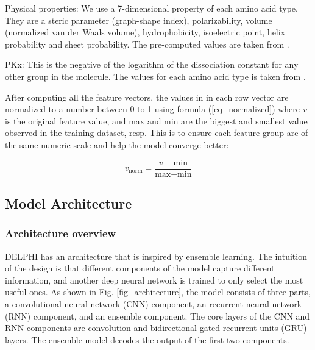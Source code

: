Physical properties: We use a 7-dimensional property of each amino acid type. They are a steric parameter (graph-shape index), polarizability, volume (normalized van der Waals volume), hydrophobicity, isoelectric point, helix probability and sheet probability. The pre-computed values are taken from \cite{zhang2019sequence}.

PKx: This is the negative of the logarithm of the dissociation constant for any other group in the molecule. The values for each amino acid type is taken from \cite{zhang2019sequence}.

After computing all the feature vectors, the values in in each row vector are normalized to a number between 0 to 1 using formula (\ref{eq_normalized}) where \textit{v} is the original feature value, and max and min are the biggest and smallest value observed in the training dataset, resp. This is to ensure each feature group are of the same numeric scale and help the model converge better:

\begin{equation}
v_\text{norm}=\dfrac{v-\text{min}}{\text{max}-\text{min}}\label{eq_normalized}
\end{equation}

\subsection{Model Architecture}
\subsubsection{Architecture overview}
DELPHI has an architecture that is inspired by ensemble learning. The intuition of the design is that different components of the model capture different information, and another deep neural network is trained to only select the most useful ones. As shown in Fig. \ref{fig_architecture}, the model consists of three parts, a convolutional neural network (CNN) component, an recurrent neural network (RNN) component, and an ensemble component. The core layers of the CNN and RNN components are convolution and bidirectional gated recurrent units (GRU) layers. The ensemble model decodes the output of the first two components.  

